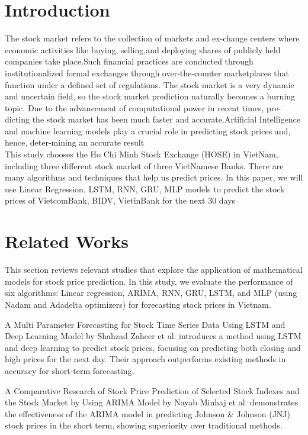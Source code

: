 \documentclass{ieeeojies}
\begin{document}
\section{Introduction}
The stock market refers to the collection of markets and ex-change centers where economic activities like buying, selling,and deploying shares of publicly held companies take place.Such financial practices are conducted through institutionalized formal exchanges through over‐the‐counter marketplaces that function under a defined set of regulations. The stock market is a very dynamic and uncertain field, so the stock market prediction naturally becomes a burning topic. Due to the advancement of computational power in recent times, pre-dicting the stock market has been much faster and accurate.Artificial Intelligence and machine learning models play a crucial role in predicting stock prices and, hence, deter-mining an accurate result \cite{b1} \\
This study chooses the Ho Chi Minh Stock Exchange (HOSE) in VietNam, including three different stock market of three VietNamese Banks. There are many algorithms and techniques that help us predict prices. In this paper, we will use Linear Regression, LSTM, RNN, GRU, MLP models to predict the stock prices of VietcomBank, BIDV, VietinBank for the next 30 days

\section{Related Works}
This section reviews relevant studies that explore the application of mathematical models for stock price prediction. In this study, we evaluate the performance of six algorithms: Linear regression, ARIMA, RNN, GRU, LSTM, and MLP (using Nadam and Adadelta optimizers) for forecasting stock prices in Vietnam. 

A Multi Parameter Forecasting for Stock Time Series Data Using LSTM and Deep Learning Model by Shahzad Zaheer et al. introduces a method using LSTM and deep learning to predict stock prices, focusing on predicting both closing and high prices for the next day. Their approach outperforms existing methods in accuracy for short-term forecasting. \cite{b2} 

A Comparative Research of Stock Price Prediction of Selected Stock Indexes and the Stock Market by Using ARIMA Model by Nayab Minhaj et al. demonstrates the effectiveness of the ARIMA model in predicting Johnson \& Johnson (JNJ) stock prices in the short term, showing superiority over traditional methods. \cite{b3} 
\end{document}
